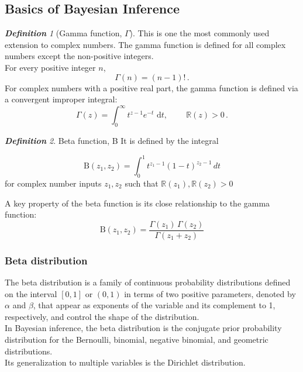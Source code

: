 \documentclass[12pt,oneside,a4paper]{book}
\theoremstyle{definition}
\theoremstyle{remark}
\newtheorem{defn}{\bf Definition}[subsection]
\begin{document}
			\subsection{Basics of Bayesian Inference}
				\begin{defn}[Gamma function, $\Gamma$]
					This is one the most commonly used extension to complex numbers. The gamma function is defined for all complex numbers except the non-positive integers.\\
					For every positive integer $n$,
					\begin{equation}\label{eqn:gamma_int}
						\Gamma (n)=(n-1)!\,.
					\end{equation}
					For complex numbers with a positive real part, the gamma function is defined via a convergent improper integral:
						\begin{equation}\label{eqn:gamma_complex}
							\Gamma (z)=\int _{0}^{\infty }t^{z-1}e^{-t}{\text{ d}}t,\ \qquad \mathbb{R} (z)>0\,.
						\end{equation}
				\end{defn}

				\begin{defn}{Beta function, B}
					It is defined by the integral

						\begin{equation} \label{eqn:beta}
							\mathrm {B} (z_{1},z_{2})=\int _{0}^{1}t^{z_{1}-1}(1-t)^{z_{2}-1}\,dt			\end{equation}
					for complex number inputs $z_{1},z_{2}$ such that $\mathbb{R}	 (z_{1}),\mathbb{R}(z_{2})>0$
				\end{defn}
				A key property of the beta function is its close relationship to the gamma function:
				\begin{equation}
					\mathrm {B} (z_{1},z_{2})={\frac {\Gamma (z_{1})\,\Gamma (z_{2})}{\Gamma (z_{1}+z_{2})}}
				\end{equation}
				\subsubsection{Beta distribution}
					The beta distribution is a family of continuous probability distributions defined on the interval $[0, 1]$ or $(0, 1)$ in terms of two positive parameters, denoted by $\alpha$ and $\beta$, that appear as exponents of the variable and its complement to 1, respectively, and control the shape of the distribution.\\
					In Bayesian inference, the beta distribution is the conjugate prior probability distribution for the Bernoulli, binomial, negative binomial, and geometric distributions.\\
					Its generalization to multiple variables is the Dirichlet distribution.\\
\end{document}
